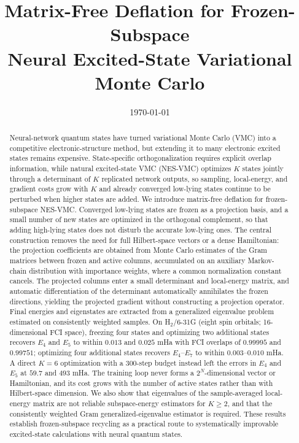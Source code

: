 \documentclass[11pt,a4paper]{article}
\title{Matrix-Free Deflation for Frozen-Subspace\\ Neural Excited-State Variational Monte Carlo}
\author{}
\date{\today}
\begin{document}
\maketitle

\begin{abstract}
Neural-network quantum states have turned variational Monte Carlo (VMC) into a competitive electronic-structure method, but extending it to many electronic excited states remains expensive. State-specific orthogonalization requires explicit overlap information, while natural excited-state VMC (NES-VMC) optimizes $K$ states jointly through a determinant of $K$ replicated network outputs, so sampling, local-energy, and gradient costs grow with $K$ and already converged low-lying states continue to be perturbed when higher states are added. We introduce matrix-free deflation for frozen-subspace NES-VMC. Converged low-lying states are frozen as a projection basis, and a small number of new states are optimized in the orthogonal complement, so that adding high-lying states does not disturb the accurate low-lying ones. The central construction removes the need for full Hilbert-space vectors or a dense Hamiltonian: the projection coefficients are obtained from Monte Carlo estimates of the Gram matrices between frozen and active columns, accumulated on an auxiliary Markov-chain distribution with importance weights, where a common normalization constant cancels. The projected columns enter a small determinant and local-energy matrix, and automatic differentiation of the determinant automatically annihilates the frozen directions, yielding the projected gradient without constructing a projection operator. Final energies and eigenstates are extracted from a generalized eigenvalue problem estimated on consistently weighted samples. On H$_2$/6-31G (eight spin orbitals; 16-dimensional FCI space), freezing four states and optimizing two additional states recovers $E_4$ and $E_5$ to within $0.013$ and $0.025$ mHa with FCI overlaps of $0.99995$ and $0.99751$; optimizing four additional states recovers $E_4$--$E_7$ to within $0.003$--$0.010$ mHa. A direct $K=6$ optimization with a 300-step budget instead left the errors in $E_4$ and $E_5$ at $59.7$ and $493$ mHa. The training loop never forms a $2^N$-dimensional vector or Hamiltonian, and its cost grows with the number of active states rather than with Hilbert-space dimension. We also show that eigenvalues of the sample-averaged local-energy matrix are not reliable subspace-energy estimators for $K\ge 2$, and that the consistently weighted Gram generalized-eigenvalue estimator is required. These results establish frozen-subspace recycling as a practical route to systematically improvable excited-state calculations with neural quantum states.
\end{abstract}
\end{document}
